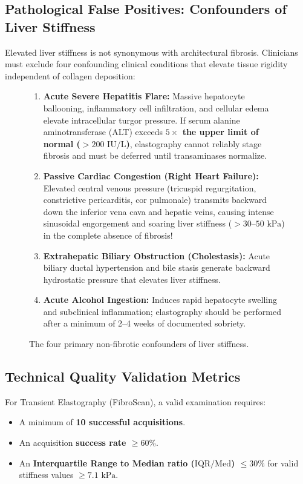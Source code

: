 \documentclass[11pt,a4paper]{article}
\begin{document}
\subsection{Pathological False Positives: Confounders of Liver Stiffness}
Elevated liver stiffness is not synonymous with architectural fibrosis. Clinicians must exclude four confounding clinical conditions that elevate tissue rigidity independent of collagen deposition:
\begin{figure}[htbp]
\centering
\begin{tcolorbox}[colback=purple!5!white,colframe=purple!60!black,title=\textbf{The Four Major Confounders of Elevated Liver Stiffness},width=\linewidth]
\small
\begin{enumerate}[leftmargin=1.5em]
    \item \textbf{Acute Severe Hepatitis Flare:} Massive hepatocyte ballooning, inflammatory cell infiltration, and cellular edema elevate intracellular turgor pressure. If serum alanine aminotransferase (ALT) exceeds \textbf{$5\times$ the upper limit of normal ($> 200\text{ IU/L}$)}, elastography cannot reliably stage fibrosis and must be deferred until transaminases normalize.
    \item \textbf{Passive Cardiac Congestion (Right Heart Failure):} Elevated central venous pressure (tricuspid regurgitation, constrictive pericarditis, cor pulmonale) transmits backward down the inferior vena cava and hepatic veins, causing intense sinusoidal engorgement and soaring liver stiffness ($> 30\text{--}50\text{ kPa}$) in the complete absence of fibrosis!
    \item \textbf{Extrahepatic Biliary Obstruction (Cholestasis):} Acute biliary ductal hypertension and bile stasis generate backward hydrostatic pressure that elevates liver stiffness.
    \item \textbf{Acute Alcohol Ingestion:} Induces rapid hepatocyte swelling and subclinical inflammation; elastography should be performed after a minimum of 2--4 weeks of documented sobriety.
\end{enumerate}
\end{tcolorbox}
\caption{The four primary non-fibrotic confounders of liver stiffness.}
\label{fig:confounders}
\end{figure}

\subsection{Technical Quality Validation Metrics}
For Transient Elastography (FibroScan), a valid examination requires:
\begin{itemize}
    \item A minimum of \textbf{10 successful acquisitions}.
    \item An acquisition \textbf{success rate $\ge 60\%$}.
    \item An \textbf{Interquartile Range to Median ratio ($\text{IQR}/\text{Med}$) $\le 30\%$} for valid stiffness values $\ge 7.1\text{ kPa}$.
\end{itemize}
\end{document}
